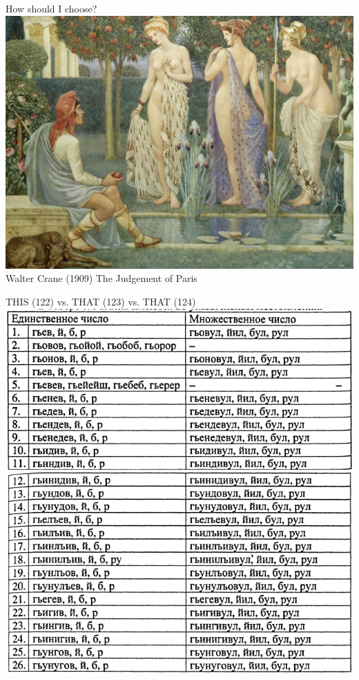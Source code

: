 \documentclass[13pt, t]{beamer}
\begin{document}
\begin{frame}{How should I choose?}
\includegraphics[width = \linewidth]{images/01_paris}\\
\small Walter Crane (1909) The Judgement of Paris
\end{frame}

\begin{frame}{THIS (122) vs. THAT (123) vs. THAT (124)}
\cite[144--145]{salimov10}\\
\includegraphics[width = 0.69\linewidth]{images/02_salimov}
\end{frame}
\end{document}
